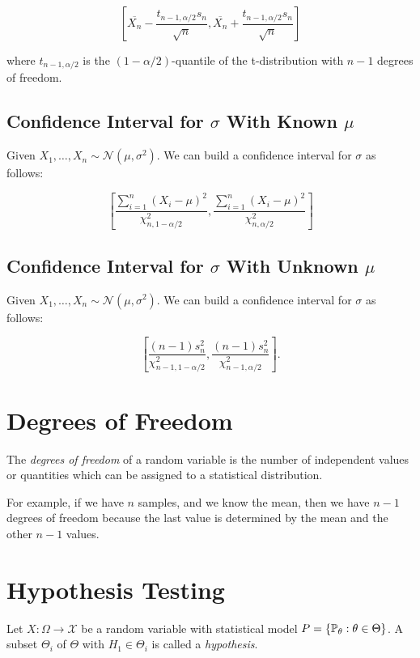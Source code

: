 \[
    \left[\overline{X_n} - \frac{t_{n - 1, \alpha/2} s_n}{\sqrt{n}}, \overline{X_n} + \frac{t_{n - 1, \alpha/2} s_n}{\sqrt{n}}\right]
\]

where \(t_{n - 1, \alpha/2}\) is the \((1 - \alpha/2)\)-quantile of the t-distribution with \(n - 1\) degrees of freedom.

\subsection{Confidence Interval for \(\sigma\) With Known \(\mu\)}

Given \(X_1,  \dots, X_n \sim \mathcal{N}(\mu, \sigma^2)\). We can build a confidence interval for \(\sigma\) as follows:

\[
    \left[\frac{\sum_{i = 1}^{n} (X_i - \mu)^2}{\chi^2_{n, 1 - \alpha/2}}, \frac{\sum_{i = 1}^{n} (X_i - \mu)^2}{\chi^2_{n,\alpha/2}}\right]
\]

\subsection{Confidence Interval for \(\sigma\) With Unknown \(\mu\)}

Given \(X_1,  \dots, X_n \sim \mathcal{N}(\mu, \sigma^2)\). We can build a confidence interval for \(\sigma\) as follows:

\[
    \left[\frac{(n - 1) s_n^2}{\chi^2_{n - 1, 1 - \alpha/2}}, \frac{(n - 1) s_n^2}{\chi^2_{n - 1, \alpha/2}}\right].
\]

\section{Degrees of Freedom}

The \emph{degrees of freedom} of a random variable is the number of independent values or quantities which can be 
assigned to a statistical distribution.

For example, if we have \(n\) samples, and we know the mean, then we have \(n - 1\) degrees of freedom because
the last value is determined by the mean and the other \(n - 1\) values.

\section{Hypothesis Testing}

Let \(X: \Omega \to \mathcal{X}\) be a random variable with statistical model
\(P = \{\mathbb{P}_\theta : \theta \in \Theta\}\). A subset \(\Theta_i\) of \(\Theta\) with \(H_1 \in \Theta_i\) is 
called a \emph{hypothesis}.

